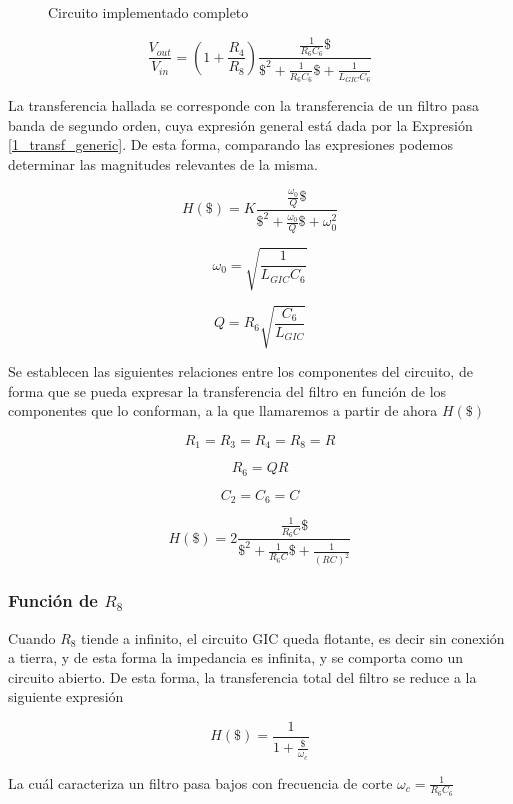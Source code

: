 \begin{figure}[h]
\centering

\caption{Circuito implementado completo}
\label{fig:6_circuito_completo}
\end{figure}

\begin{equation}
\frac{V_{out}}{V_{in}} = \left(1+\frac{R_4}{R_8}\right) \frac{\frac{1}{R_6C_6}\$}{\$^2 + \frac{1}{R_6C_6}\$ + \frac{1}{L_{GIC}C_6}}
\label{1_transfer_completa}
\end{equation}

La transferencia hallada se corresponde con la transferencia de un filtro pasa banda de segundo orden, cuya expresión general está dada por la Expresión \ref{1_transf_generic}. De esta forma, comparando las expresiones podemos determinar las magnitudes relevantes de la misma.

\begin{equation}
H(\$) = K\frac{\frac{\omega_0}{Q}\$}{\$^2 + \frac{\omega_0}{Q}\$ + \omega_0^2}
\label{1_transf_generic}
\end{equation}

\[
\omega_0 = \sqrt{\frac{1}{L_{GIC}C_6}}
\]

\[
Q = R_6 \sqrt{\frac{C_6}{L_{GIC}}}
\]

Se establecen las siguientes relaciones entre los componentes del circuito, de forma que se pueda expresar la transferencia del filtro en función de los componentes que lo conforman, a la que llamaremos a partir de ahora $H(\$)$

\[
R_1 = R_3 = R_4 = R_8 = R
\]

\[
R_6 = QR
\]

\[
C_2 = C_6 = C
\]

\[
H(\$) = 2 \frac{\frac{1}{R_6C}\$}{\$^2 + \frac{1}{R_6C}\$ + \frac{1}{(RC)^2}}
\]

\subsubsection{Función de $R_8$}

Cuando $R_8$ tiende a infinito, el circuito GIC queda flotante, es decir sin conexión a tierra, y de esta forma la impedancia es infinita, y se comporta como un circuito abierto. De esta forma, la transferencia total del filtro se reduce a la siguiente expresión

\[
H(\$) = \frac{1}{1 + \frac{\$}{\omega_c}}
\]

La cuál caracteriza un filtro pasa bajos con frecuencia de corte $\omega_c = \frac{1}{R_6C_6}$



